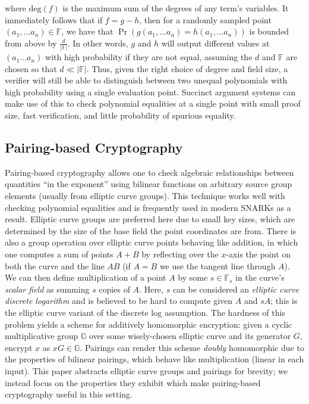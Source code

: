 \noindent where $\text{deg}(f)$ is the maximum sum of the degrees of any term's variables. It immediately follows that if $f = g-h$, then for a randomly sampled point $(a_1, \dots a_n) \in \mathbb{F}$, we have that $\Pr(g(a_1, \dots a_n) = h(a_1, \dots a_n))$ is bounded from above by $\frac{d}{|\mathbb{F}|}$. In other words, $g$ and $h$ will output different values at $(a_1 \dots a_n)$ with high probability if they are not equal, assuming the $d$ and $\mathbb{F}$ are chosen so that $d \ll |\mathbb{F}|$. Thus, given the right choice of degree and field size, a verifier will still be able to distinguish between two unequal polynomials with high probability using a single evaluation point. Succinct argument systems can make use of this to check polynomial equalities at a single point with small proof size, fast verification, and little probability of spurious equality.

\subsection{Pairing-based Cryptography}

\noindent Pairing-based cryptography \cite{ibepairings} allows one to check algebraic relationships between quantities ``in the exponent'' using bilinear functions on arbitrary source group elements (usually from elliptic curve groups). This technique works well with checking polynomial equalities and is frequently used in modern SNARKs as a result. Elliptic curve groups are preferred here due to small key sizes, which are determined by the size of the base field the point coordinates are from. There is also a group operation over elliptic curve points behaving like addition, in which one computes a sum of points $A + B$ by reflecting over the $x$-axis the point on both the curve and the line $AB$ (if $A = B$ we use the tangent line through $A$). We can then define multiplication of a point $A$ by some $s \in \mathbb{F}_s$ in the curve's \textit{scalar field} as summing $s$ copies of $A$. Here, $s$ can be considered an \textit{elliptic curve discrete logarithm} and is believed to be hard to compute given $A$ and $sA$; this is the elliptic curve variant of the discrete log assumption. The hardness of this problem yields a scheme for additively homomorphic encryption: given a cyclic multiplicative group $\mathbb{G}$ over some wisely-chosen elliptic curve and its generator $G$, encrypt $x$ as $xG \in \mathbb{G}$. Pairings can render this scheme \textit{doubly} homomorphic due to the properties of bilinear pairings, which behave like multiplication (linear in each input). This paper abstracts elliptic curve groups and pairings for brevity; we instead focus on the properties they exhibit which make pairing-based cryptography useful in this setting.\\

